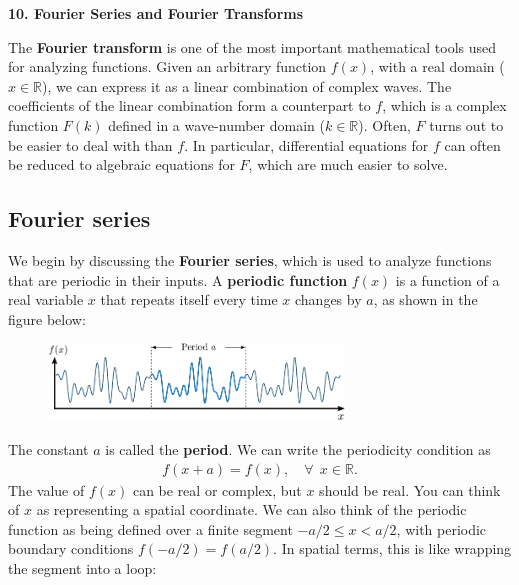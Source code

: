 \documentclass[10pt,a4paper]{article}
\begin{document}
\setcounter{page}{77}

\noindent
{\Large \textbf{10. Fourier Series and Fourier Transforms}}
\vskip 0.2in

\label{fourier-series-and-fourier-transforms}

The \textbf{Fourier transform} is one of the most important
mathematical tools used for analyzing functions.  Given an arbitrary
function $f(x)$, with a real domain ($x \in \mathbb{R}$), we can
express it as a linear combination of complex waves.  The coefficients
of the linear combination form a counterpart to $f$, which is a
complex function $F(k)$ defined in a wave-number domain ($k \in
\mathbb{R}$). Often, $F$ turns out to be easier to deal with than
$f$. In particular, differential equations for $f$ can often be
reduced to algebraic equations for $F$, which are much easier to
solve.

\subsection{Fourier series}
\label{fourier-series}

We begin by discussing the \textbf{Fourier series}, which is used to
analyze functions that are periodic in their inputs.  A
\textbf{periodic function} $f(x)$ is a function of a real variable $x$
that repeats itself every time $x$ changes by $a$, as shown in the
figure below:

\begin{figure}[ht]
  \centering\includegraphics[width=0.7\textwidth]{periodicity}
\end{figure}

The constant $a$ is called the \textbf{period}.  We can write the
periodicity condition as
\begin{align}
  f(x+a) = f(x), \quad\forall\;\, x\in \mathbb{R}.
\end{align}
The value of $f(x)$ can be real or complex, but $x$ should be real.
You can think of $x$ as representing a spatial coordinate. We can also
think of the periodic function as being defined over a finite segment
$-a/2 \le x < a/2$, with periodic boundary conditions $f(-a/2) =
f(a/2)$. In spatial terms, this is like wrapping the segment into a
loop:
\end{document}
